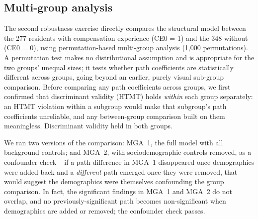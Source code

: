 \subsection{Multi-group analysis}
\label{robustness:mga}

The second robustness exercise directly compares the structural model
between the 277 residents with compensation experience (CE0 = 1) and the
348 without (CE0 = 0), using permutation-based multi-group analysis
(1{,}000 permutations). A permutation test makes no distributional
assumption and is appropriate for the two groups' unequal sizes; it tests
whether path coefficients are statistically different across groups, going
beyond an earlier, purely visual sub-group comparison. Before comparing any
path coefficients across groups, we first confirmed that discriminant
validity (HTMT) holds \emph{within} each group separately: an HTMT violation
within a subgroup would make that subgroup's path coefficients unreliable,
and any between-group comparison built on them meaningless. Discriminant
validity held in both groups.

We ran two versions of the comparison: MGA~1, the full model with all
background controls; and MGA~2, with sociodemographic controls removed, as a
confounder check -- if a path difference in MGA~1 disappeared once
demographics were added back and a \emph{different} path emerged once they
were removed, that would suggest the demographics were themselves confounding
the group comparison. In fact, the significant findings in MGA~1 and MGA~2 do
not overlap, and no previously-significant path becomes non-significant when
demographics are added or removed; the confounder check passes.

